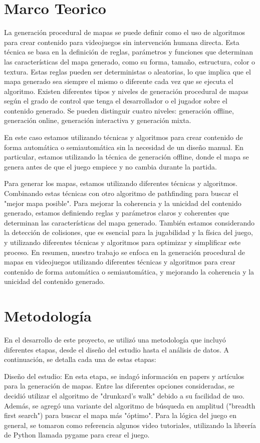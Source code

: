 \documentclass[stu, 12pt, letterpaper, donotrepeattitle, floatsintext, natbib]{apa7}
\begin{document}
\section{\large Marco Teorico}
La generación procedural de mapas se puede definir como el uso de algoritmos para crear contenido para videojuegos sin intervención humana directa. Esta técnica se basa en la definición de reglas, parámetros y funciones que determinan las características del mapa generado, como su forma, tamaño, estructura, color o textura. Estas reglas pueden ser deterministas o aleatorias, lo que implica que el mapa generado sea siempre el mismo o diferente cada vez que se ejecuta el algoritmo. Existen diferentes tipos y niveles de generación procedural de mapas según el grado de control que tenga el desarrollador o el jugador sobre el contenido generado. Se pueden distinguir cuatro niveles: generación offline, generación online, generación interactiva y generación mixta.

En este caso estamos utilizando técnicas y algoritmos para crear contenido de forma automática o semiautomática sin la necesidad de un diseño manual. En particular, estamos utilizando la técnica de generación offline, donde el mapa se genera antes de que el juego empiece y no cambia durante la partida.

Para generar los mapas, estamos utilizando diferentes técnicas y algoritmos. Combinando estas técnicas con otro algoritmo de pathfinding para buscar el "mejor mapa posible". Para mejorar la coherencia y la unicidad del contenido generado, estamos definiendo reglas y parámetros claros y coherentes que determinan las características del mapa generado. También estamos considerando la detección de colisiones, que es esencial para la jugabilidad y la física del juego, y utilizando diferentes técnicas y algoritmos para optimizar y simplificar este proceso. En resumen, nuestro trabajo se enfoca en la generación procedural de mapas en videojuegos utilizando diferentes técnicas y algoritmos para crear contenido de forma automática o semiautomática, y mejorando la coherencia y la unicidad del contenido generado.
\section{\large Metodología}
En el desarrollo de este proyecto, se utilizó una metodología que incluyó diferentes etapas, desde el diseño del estudio hasta el análisis de datos. A continuación, se detalla cada una de estas etapas:

Diseño del estudio:
En esta etapa, se indagó información en papers y artículos para la generación de mapas. Entre las diferentes opciones consideradas, se decidió utilizar el algoritmo de "drunkard's walk" debido a su facilidad de uso. Además, se agregó una variante del algoritmo de búsqueda en amplitud ("breadth first search") para buscar el mapa más "óptimo". Para la lógica del juego en general, se tomaron como referencia algunos video tutoriales, utilizando la librería de Python llamada pygame para crear el juego.
\end{document}
